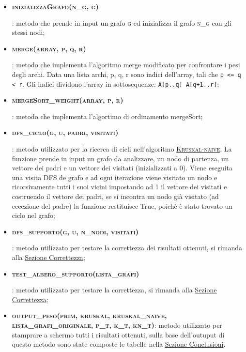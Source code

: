 \begin{itemize}
    
    \item \hypertarget{inizializzagrafo}{\textbf{\textsc{inizializzaGrafo(n\_g, g)}}}: metodo che prende in input un grafo \textsc{g} ed inizializza il grafo \textsc{n\_g} con gli stessi nodi;
    
    \item \hypertarget{merge}{\textbf{\textbf{\textsc{merge(array, p, q, r)}}}}: metodo che implementa l'algoritmo merge modificato per confrontare i pesi degli archi. Data una lista archi, p, q, r sono indici dell'array, tali che \texttt{p <= q < r}. Gli indici dividono l'array in sottosequenze: \texttt{A[p..q] A[q+1..r]};
    
    \item \hypertarget{mergesort}{\textbf{\textsc{mergeSort\_weight(array, p, r)}}}: metodo che implementa l'algortimo di ordinamento mergeSort;
    
    \item \hypertarget{dfsciclo}{\textbf{\textsc{dfs\_ciclo(g, u, padri, visitati)}}}: metodo utilizzato per la ricerca di cicli nell'algoritmo \hyperlink{section.4}{\textsc{Kruskal-naive}}. La funzione prende in input un grafo da analizzare, un nodo di partenza, un vettore dei padri e un vettore dei visitati (inizializzati a 0). Viene eseguita una visita DFS de grafo e ad ogni iterazione viene visitato un nodo e ricorsivamente tutti i suoi vicini impostando ad 1 il vettore dei visitati e costruendo il vettore dei padri, se si incontra un nodo già visitato (ad eccezione del padre) la funzione restituisce True, poichè è stato trovato un ciclo nel grafo;
    
    \item \hypertarget{dfssupporto}{\textbf{\textsc{dfs\_supporto(g, u, n\_nodi, visitati)}}}: metodo utilizzato per testare la correttezza dei risultati ottenuti, si rimanda alla  \hyperlink{section.6}{Sezione Correttezza};
    
    \item \hypertarget{testalberosupporto}{\textbf{\textsc{test\_albero\_supporto(lista\_grafi)}}}: metodo utilizzato per testare la correttezza, si rimanda alla \hyperlink{section.6}{Sezione Correttezza};
    
    \item \textbf{\textsc{output\_peso(prim, kruskal, kruskal\_naive, lista\_grafi\_originale, p\_t, k\_t, kn\_t)}}: metodo utilizzato per stamprare a schermo tutti i risultati ottenuti, sulla base dell'outuput di questo metodo sono state composte le tabelle nella \hyperlink{section.8}{Sezione Conclusioni}.
    
\end{itemize} 

